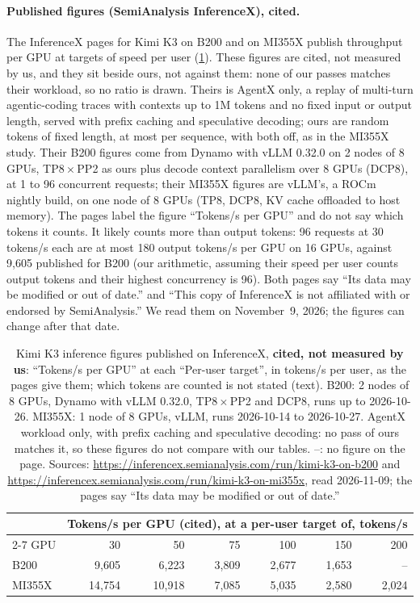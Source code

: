 \paragraph{Published figures (SemiAnalysis InferenceX), cited.} The InferenceX pages for Kimi K3 on B200 and on MI355X publish throughput per GPU at targets of speed per user (\cref{tab:kimi_inferencex}). These figures are cited, not measured by us, and they sit beside ours, not against them: none of our passes matches their workload, so no ratio is drawn. Theirs is AgentX only, a replay of multi-turn agentic-coding traces with contexts up to 1M tokens and no fixed input or output length, served with prefix caching and speculative decoding; ours are random tokens of fixed length, at most \TriKimiMaxLen{} per sequence, with both off, as in the MI355X study. Their B200 figures come from Dynamo with vLLM 0.32.0 on 2 nodes of 8 GPUs, TP8\,$\times$\,PP2 as ours plus decode context parallelism over 8 GPUs (DCP8), at 1 to 96 concurrent requests; their MI355X figures are vLLM's, a ROCm nightly build, on one node of 8 GPUs (TP8, DCP8, KV cache offloaded to host memory). The pages label the figure ``Tokens/s per GPU'' and do not say which tokens it counts. It likely counts more than output tokens: 96 requests at 30 tokens/s each are at most 180 output tokens/s per GPU on 16 GPUs, against 9,605 published for B200 (our arithmetic, assuming their speed per user counts output tokens and their highest concurrency is 96). Both pages say ``Its data may be modified or out of date.'' and ``This copy of InferenceX\texttrademark{} is not affiliated with or endorsed by SemiAnalysis.'' We read them on November~9, 2026; the figures can change after that date.

\begin{table}[h]
  \caption{Kimi K3 inference figures published on InferenceX, \textbf{cited, not measured by us}: ``Tokens/s per GPU'' at each ``Per-user target'', in tokens/s per user, as the pages give them; which tokens are counted is not stated (text). B200: 2 nodes of 8 GPUs, Dynamo with vLLM 0.32.0, TP8\,$\times$\,PP2 and DCP8, runs up to 2026-10-26. MI355X: 1 node of 8 GPUs, vLLM, runs 2026-10-14 to 2026-10-27. AgentX workload only, with prefix caching and speculative decoding: no pass of ours matches it, so these figures do not compare with our tables. --: no figure on the page. Sources: \url{https://inferencex.semianalysis.com/run/kimi-k3-on-b200} and \url{https://inferencex.semianalysis.com/run/kimi-k3-on-mi355x}, read 2026-11-09; the pages say ``Its data may be modified or out of date.''}
  \label{tab:kimi_inferencex}
  \centering\small
  \begin{tabular}{lrrrrrr}
    \toprule
     & \multicolumn{6}{c}{Tokens/s per GPU (cited), at a per-user target of, tokens/s} \\
    \cmidrule(l){2-7}
    GPU & 30 & 50 & 75 & 100 & 150 & 200 \\
    \midrule
    B200 & 9,605 & 6,223 & 3,809 & 2,677 & 1,653 & -- \\
    MI355X & 14,754 & 10,918 & 7,085 & 5,035 & 2,580 & 2,024 \\
    \bottomrule
  \end{tabular}
\end{table}

